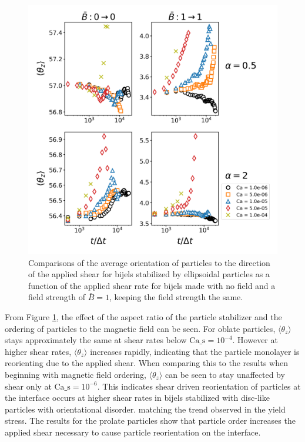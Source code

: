 \begin{figure} 
    \centering 
    \includegraphics[scale=0.5]{../figures/results/paper3/theta_z-time_compare-specific.png} 
    \caption{Comparisons of the average orientation of particles to the direction of the applied shear for bijels stabilized by
             ellipsoidal particles as a function of the applied shear rate for bijels made with no field and a field strength of $\bar{B} = 1$,
             keeping the field strength the same.} 
    \label{fig:theta_z_specific} 
\end{figure}

From Figure \ref{fig:theta_z_specific}, the effect of the aspect ratio of the particle stabilizer and the ordering of particles to the magnetic field can be seen. For oblate 
particles, $\langle \theta_z \rangle$ stays approximately the same at shear rates below $\text{Ca_s} = 10^{-4}$. However at higher shear rates,
$\langle \theta_z \rangle$ increases rapidly, indicating that the particle monolayer is reorienting due to the applied shear. When comparing this to the results when beginning with 
magnetic field ordering, $\langle \theta_z \rangle$ can be seen to stay unaffected by shear only at $\text{Ca_s} = 10^{-6}$. This indicates shear driven reorientation of particles at the interface 
occurs at higher shear rates in bijels stabilized with disc-like particles with orientational disorder. matching the trend observed in the yield stress. The results for the prolate particles show 
that particle order increases the applied shear necessary to cause particle reorientation on the interface.

